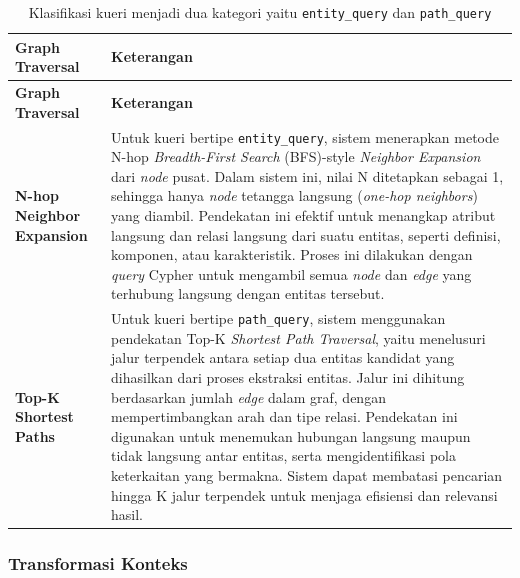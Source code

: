 \begin{longtable}{|p{}|p{}|}
	\caption{Klasifikasi kueri menjadi dua kategori yaitu \texttt{entity\_query} dan \texttt{path\_query}}
	\label{tab:graph-traversal-strategy}                                                                                                                     \\
	\hline
	\textbf{Graph Traversal}          & \textbf{Keterangan}                                                                                                  \\
	\hline \hline
	\endfirsthead

	\hline
	\textbf{Graph Traversal}          & \textbf{Keterangan}                                                                                                  \\
	\hline \hline
	\endhead

	\textbf{N-hop Neighbor Expansion} &
	Untuk kueri bertipe \texttt{entity\_query}, sistem menerapkan metode N-hop \textit{Breadth-First Search} (BFS)-style \textit{Neighbor Expansion} dari \textit{node} pusat.
	Dalam sistem ini, nilai N ditetapkan sebagai 1, sehingga hanya \textit{node} tetangga langsung (\textit{one-hop neighbors}) yang diambil.
	Pendekatan ini efektif untuk menangkap atribut langsung dan relasi langsung dari suatu entitas, seperti definisi, komponen, atau karakteristik.
	Proses ini dilakukan dengan \textit{query} Cypher untuk mengambil semua \textit{node} dan \textit{edge} yang terhubung langsung dengan entitas tersebut. \\
	\hline
	\textbf{Top-K Shortest Paths}     &
	Untuk kueri bertipe \texttt{path\_query}, sistem menggunakan pendekatan Top-K \textit{Shortest Path Traversal}, yaitu menelusuri jalur terpendek antara setiap dua entitas kandidat yang dihasilkan dari proses ekstraksi entitas.
	Jalur ini dihitung berdasarkan jumlah \textit{edge} dalam graf, dengan mempertimbangkan arah dan tipe relasi.
	Pendekatan ini digunakan untuk menemukan hubungan langsung maupun tidak langsung antar entitas, serta mengidentifikasi pola keterkaitan yang bermakna.
	Sistem dapat membatasi pencarian hingga K jalur terpendek untuk menjaga efisiensi dan relevansi hasil.                                                   \\
	\hline
\end{longtable}


\subsubsection{Transformasi Konteks}

